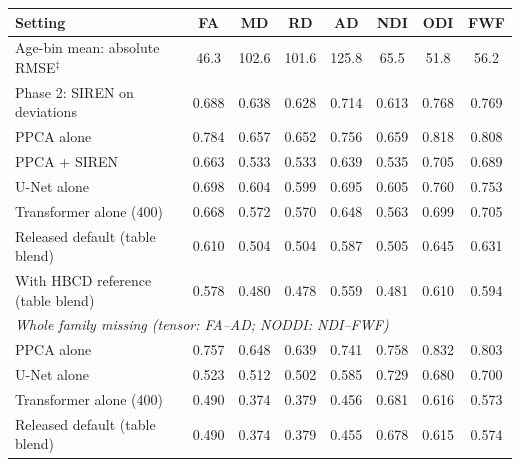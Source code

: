 \begin{tabular}{lccccccc}
\toprule
Setting & FA & MD & RD & AD & NDI & ODI & FWF \\
\midrule
Age-bin mean: absolute RMSE$^{\ddagger}$ & 46.3 & 102.6 & 101.6 & 125.8 & 65.5 & 51.8 & 56.2 \\
\midrule
Phase 2: SIREN on deviations & 0.688 & 0.638 & 0.628 & 0.714 & 0.613 & 0.768 & 0.769 \\
PPCA alone & 0.784 & 0.657 & 0.652 & 0.756 & 0.659 & 0.818 & 0.808 \\
PPCA + SIREN & 0.663 & 0.533 & 0.533 & 0.639 & 0.535 & 0.705 & 0.689 \\
U-Net alone & 0.698 & 0.604 & 0.599 & 0.695 & 0.605 & 0.760 & 0.753 \\
Transformer alone (400) & 0.668 & 0.572 & 0.570 & 0.648 & 0.563 & 0.699 & 0.705 \\
Released default (table blend) & 0.610 & 0.504 & 0.504 & 0.587 & 0.505 & 0.645 & 0.631 \\
With HBCD reference (table blend) & 0.578 & 0.480 & 0.478 & 0.559 & 0.481 & 0.610 & 0.594 \\
\midrule
\multicolumn{8}{l}{\textit{Whole family missing (tensor: FA--AD; NODDI: NDI--FWF)}} \\
PPCA alone & 0.757 & 0.648 & 0.639 & 0.741 & 0.758 & 0.832 & 0.803 \\
U-Net alone & 0.523 & 0.512 & 0.502 & 0.585 & 0.729 & 0.680 & 0.700 \\
Transformer alone (400) & 0.490 & 0.374 & 0.379 & 0.456 & 0.681 & 0.616 & 0.573 \\
Released default (table blend) & 0.490 & 0.374 & 0.379 & 0.455 & 0.678 & 0.615 & 0.574 \\
\bottomrule
\end{tabular}
